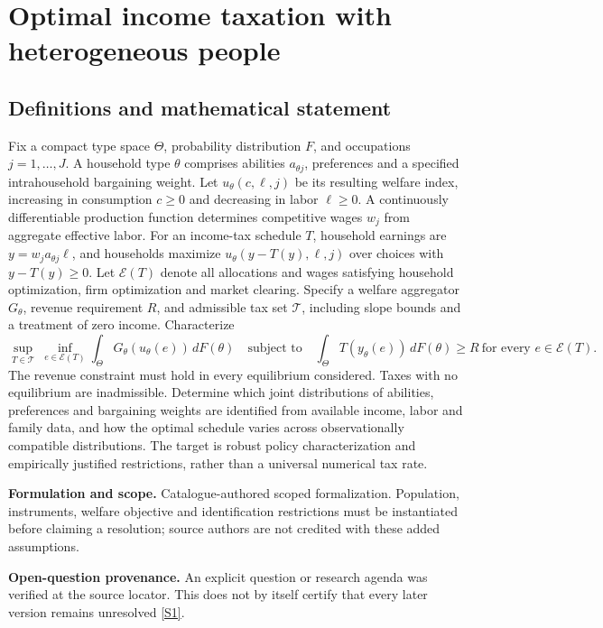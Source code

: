 \documentclass[11pt]{article}
\newcommand{\sref}[2]{\hyperlink{source:#1:#2}{[S#2]}}
\begin{document}
\section*{Optimal income taxation with heterogeneous people}\label{30007752}
\subsection{Definitions and mathematical statement}
Fix a compact type space \(\Theta\), probability distribution \(F\), and occupations \(j=1,\ldots,J\). A household type \(\theta\) comprises abilities \(a_{\theta j}\), preferences and a specified intrahousehold bargaining weight. Let \(u_\theta(c,\ell,j)\) be its resulting welfare index, increasing in consumption \(c\geq0\) and decreasing in labor \(\ell\geq0\). A continuously differentiable production function determines competitive wages \(w_j\) from aggregate effective labor. For an income-tax schedule \(T\), household earnings are \(y=w_j a_{\theta j}\ell\), and households maximize \(u_\theta(y-T(y),\ell,j)\) over choices with \(y-T(y)\geq0\). Let \(\mathcal E(T)\) denote all allocations and wages satisfying household optimization, firm optimization and market clearing. Specify a welfare aggregator \(G_\theta\), revenue requirement \(R\), and admissible tax set \(\mathcal T\), including slope bounds and a treatment of zero income. Characterize
\[\sup_{T\in\mathcal T}\ \inf_{e\in\mathcal E(T)}\int_\Theta G_\theta(u_\theta(e))\,dF(\theta)\quad\text{subject to}\quad \int_\Theta T(y_\theta(e))\,dF(\theta)\geq R\ \text{for every }e\in\mathcal E(T).\]
The revenue constraint must hold in every equilibrium considered. Taxes with no equilibrium are inadmissible. Determine which joint distributions of abilities, preferences and bargaining weights are identified from available income, labor and family data, and how the optimal schedule varies across observationally compatible distributions. The target is robust policy characterization and empirically justified restrictions, rather than a universal numerical tax rate.

\par\textbf{Formulation and scope.} Catalogue-authored scoped formalization. Population, instruments, welfare objective and identification restrictions must be instantiated before claiming a resolution; source authors are not credited with these added assumptions.

\par\textbf{Open-question provenance.} An explicit question or research agenda was verified at the source locator. This does not by itself certify that every later version remains unresolved \sref{30007752}{1}.
\end{document}
